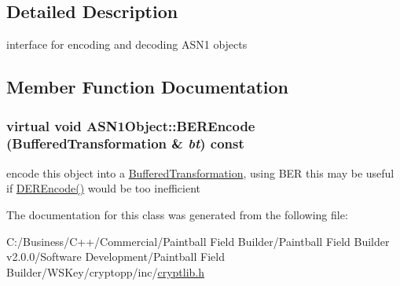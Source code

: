 \subsection{Detailed Description}
interface for encoding and decoding ASN1 objects 

\subsection{Member Function Documentation}
\hypertarget{class_a_s_n1_object_ab8446b61690a19015d3d565d86dd1d3d}{
\subsubsection[{BEREncode}]{\setlength{\rightskip}{0pt plus 5cm}virtual void ASN1Object::BEREncode ({\bf BufferedTransformation} \& {\em bt}) const}}
\label{class_a_s_n1_object_ab8446b61690a19015d3d565d86dd1d3d}


encode this object into a \hyperlink{class_buffered_transformation}{BufferedTransformation}, using BER this may be useful if \hyperlink{class_a_s_n1_object_a10e40187a6ba048dfc8a2c8ca5c6c2ec}{DEREncode()} would be too inefficient 

The documentation for this class was generated from the following file:\begin{DoxyCompactItemize}
\item 
C:/Business/C++/Commercial/Paintball Field Builder/Paintball Field Builder v2.0.0/Software Development/Paintball Field Builder/WSKey/cryptopp/inc/\hyperlink{cryptlib_8h}{cryptlib.h}\end{DoxyCompactItemize}
